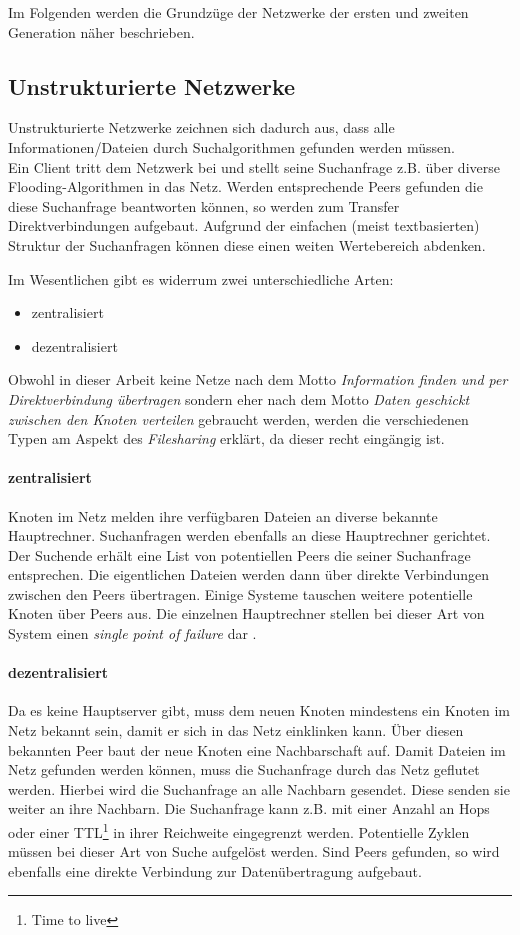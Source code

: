 Im Folgenden werden die Grundzüge der Netzwerke der ersten und zweiten Generation näher beschrieben.

\subsection{Unstrukturierte Netzwerke}
Unstrukturierte Netzwerke zeichnen sich dadurch aus, dass alle Informationen/Dateien durch Suchalgorithmen \cite{Lv2002} gefunden werden müssen. \\
Ein Client tritt dem Netzwerk bei und stellt seine Suchanfrage z.B. über diverse Flooding-Algorithmen in das Netz. Werden entsprechende Peers gefunden die diese Suchanfrage beantworten können, so werden zum Transfer Direktverbindungen aufgebaut. Aufgrund der einfachen (meist textbasierten) Struktur der Suchanfragen können diese einen weiten Wertebereich abdenken.

Im Wesentlichen gibt es widerrum zwei unterschiedliche Arten:
\begin{itemize}
\item zentralisiert
\item dezentralisiert
\end{itemize}

Obwohl in dieser Arbeit keine Netze nach dem Motto \emph{Information finden und per Direktverbindung übertragen} sondern eher nach dem Motto \emph{Daten geschickt zwischen den Knoten verteilen} gebraucht werden, werden die verschiedenen Typen am Aspekt des \emph{Filesharing} erklärt, da dieser recht eingängig ist.\\

\paragraph{zentralisiert} Knoten im Netz melden ihre verfügbaren Dateien an diverse bekannte Hauptrechner. Suchanfragen werden ebenfalls an diese Hauptrechner gerichtet. Der Suchende erhält eine List von potentiellen Peers die seiner Suchanfrage entsprechen. Die eigentlichen Dateien werden dann über direkte Verbindungen zwischen den Peers übertragen. Einige Systeme tauschen weitere potentielle Knoten über Peers aus. Die einzelnen Hauptrechner stellen bei dieser Art von System einen \emph{single point of failure} dar \cite{Eberspaecher2005}.

\paragraph{dezentralisiert} Da es keine Hauptserver gibt, muss dem neuen Knoten mindestens ein Knoten im Netz bekannt sein, damit er sich in das Netz einklinken kann. Über diesen bekannten Peer baut der neue Knoten eine Nachbarschaft auf. Damit Dateien im Netz gefunden werden können, muss die Suchanfrage durch das Netz geflutet werden. Hierbei wird die Suchanfrage an alle Nachbarn gesendet. Diese senden sie weiter an ihre Nachbarn. Die Suchanfrage kann z.B. mit einer Anzahl an Hops oder einer TTL\footnote{Time to live} in ihrer Reichweite eingegrenzt werden. Potentielle Zyklen müssen bei dieser Art von Suche aufgelöst werden. Sind Peers gefunden, so wird ebenfalls eine direkte Verbindung zur Datenübertragung aufgebaut.

